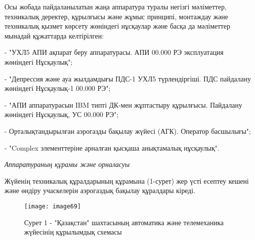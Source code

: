 \begin{multicols}{2}
Осы жобада пайдаланылатын жаңа аппаратура туралы негізгі мәліметтер,
техникалық деректер, құрылғысы және жұмыс принципі, монтаждау және
техникалық қызмет көрсету жөніндегі нұсқаулар және басқа да мәліметтер
мынадай құжаттарда келтірілген:

- "УХЛ5 АПИ ақпарат беру аппаратурасы. АПИ 00.000 РЭ эксплуатация
жөніндегі Нұсқаулық";

- "Депрессия және ауа жылдамдығы ПДС-1 УХЛ5 түрлендіргіші. ПДС пайдалану
жөніндегі Нұсқаулық-1 00.000 РЭ";

- "АПИ аппаратурасын IBM типті ДК-мен жұптастыру құрылғысы. Пайдалану
жөніндегі Нұсқаулық, УС 00.000 РЭ";

- Орталықтандырылған аэрогазды бақылау жүйесі (АГК). Оператор
басшылығы";

- "Complex элементтеріне арналған қысқаша анықтамалық нұсқаулық".

\emph{Аппаратураның құрамы және орналасуы}

Жүйенің техникалық құралдарының құрамына (1-сурет) жер үсті есептеу
кешені және өндіру учаскелерін аэрогаздық бақылау құралдары кіреді.
\end{multicols}

\begin{figure}[H]
    \centering
    \texttt{[image: image69]}
    \caption*{Сурет 1 - "Қазақстан" шахтасының автоматика және телемеханика жүйесінің құрылымдық схемасы}
\end{figure}

